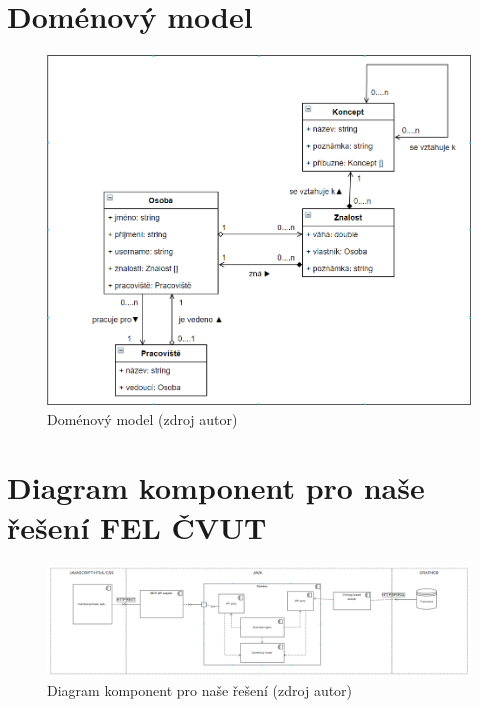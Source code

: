 \chapter{Doménový model}
\begin{figure}[htbp!]
	\includegraphics[width=\linewidth]{img/domain.png}
	\caption{Doménový model (zdroj autor)}
	\label{fig:domain-model}
\end{figure}

\chapter{Diagram komponent pro naše řešení FEL ČVUT}
\begin{figure}
	\includegraphics[width=\linewidth]{img/component-model-graphDB.png}
	\caption{Diagram komponent pro naše řešení (zdroj autor)}
	\label{fig:component-graphDB}
\end{figure}

